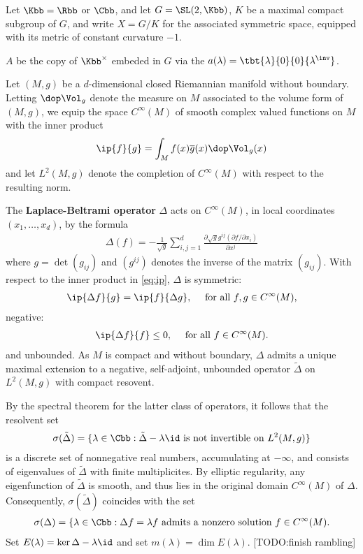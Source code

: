     Let $\Kbb = \Rbb$ or $\Cbb$, and let $G=\SL(2,\Kbb)$, $K$ be a maximal compact subgroup of $G$, and write $X = G/K$ for the associated symmetric space, equipped with its metric of constant curvature $-1$.

$A$ be the copy of $\Kbb^\times$ embeded in $G$ via the $a(\lambda) = \tbt{\lambda}{0}{0}{\lambda^\inv}$.





    \newpage
    Let $(M,g)$ be a $d$-dimensional closed Riemannian manifold without boundary.  Letting $\dop \Vol_g$ denote the measure on $M$ associated to the volume form of $(M,g)$, we equip the space $C^\infty(M)$ of smooth complex valued functions on $M$ with the inner product
    \begin{align}\label{eq:ip}
        \ip{f}{g} = \int_M f(x) \overline{g}(x) \dop \Vol_g(x)
    \end{align}
    and let $L^2(M,g)$ denote the completion of $C^\infty(M)$ with respect to the resulting norm.

    The \textbf{Laplace-Beltrami operator} $\Delta$ acts on $C^\infty(M)$, in local coordinates $(x_1,\dots,x_d)$, by the formula
    \begin{align}
        \Delta(f) = -\frac{1}{\sqrt{g}} \sum_{i,j=1}^d \frac{\partial \sqrt{g} g^{ij} (\partial f / \partial x_i)}{\partial x^j}
    \end{align}
    where $g = \det(g_{ij})$ and $(g^{ij})$ denotes the inverse of the matrix $(g_{ij})$. With respect to the inner product in \ref{eq:ip}, $\Delta$ is symmetric:
    \begin{align*}
        \ip{\Delta f}{g} =\ip{ f}{\Delta g}, \quad \text{ for all $f,g \in C^\infty(M)$,}
    \end{align*}
    negative:
    \begin{align*}
        \ip{\Delta f }{f} \leq 0, \quad \text{ for all $f \in C^\infty(M)$.}
    \end{align*}
    and unbounded. As $M$ is compact and without boundary, $\Delta$ admits a unique maximal extension to a negative, self-adjoint, unbounded operator  $\tilde{\Delta}$ on $L^2(M,g)$ with compact resovent.

    By the spectral theorem for the latter class of operators, it follows that the resolvent set
    \begin{align*}
        \sigma(\tilde{\Delta}) = \{ \lambda \in \Cbb : \tilde{\Delta} - \lambda \id \text{ is not invertible on $L^2(M,g)$}\}
    \end{align*}
    is a discrete set of nonnegative real numbers, accumulating at $-\infty$, and consists of eigenvalues of $\tilde{\Delta}$ with finite multiplicites. By elliptic regularity, any eigenfunction of $\tilde{\Delta}$ is smooth, and thus lies in the original domain $C^\infty(M)$ of $\Delta$. Consequently, $\sigma(\tilde{\Delta})$ coincides with the set
    \begin{align*}
        \sigma(\Delta) = \{\lambda \in \Cbb : \Delta f  = \lambda f \text{ admits a nonzero  solution  $f \in C^\infty(M)$}.
    \end{align*}
    Set $E(\lambda) = \ker \Delta - \lambda \id$ and set $m(\lambda) = \dim E(\lambda)$. [TODO:finish rambling]

